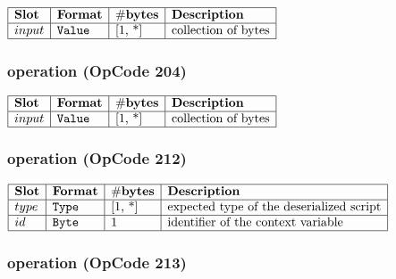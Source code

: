 \noindent
\(\begin{array}{| l | l | l | l |}
    \hline
    \bf{Slot} & \bf{Format} & \bf{\#bytes} & \bf{Description} \\
    \hline
         input & \lst{Value} & \text{[1, *]} & \text{collection of bytes} \\
    \hline
      
\end{array}\)
       

\subsubsection{ operation (OpCode 204)}

\noindent
\(\begin{array}{| l | l | l | l |}
    \hline
    \bf{Slot} & \bf{Format} & \bf{\#bytes} & \bf{Description} \\
    \hline
         input & \lst{Value} & \text{[1, *]} & \text{collection of bytes} \\
    \hline
      
\end{array}\)
       

\subsubsection{ operation (OpCode 212)}

\noindent
\(\begin{array}{| l | l | l | l |}
    \hline
    \bf{Slot} & \bf{Format} & \bf{\#bytes} & \bf{Description} \\
    \hline
         type & \lst{Type} & \text{[1, *]} & \text{expected type of the deserialized script} \\
    \hline
           id & \lst{Byte} & \text{1} & \text{identifier of the context variable} \\
    \hline
      
\end{array}\)
       

\subsubsection{ operation (OpCode 213)}

